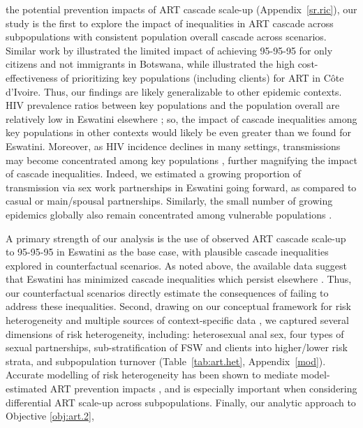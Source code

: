 the potential prevention impacts of ART cascade scale-up
\cite{Knight2022sr} (Appendix~\ref{sr.ric}),
our study is the first to explore the impact of
inequalities in ART cascade across subpopulations
with consistent population overall cascade across scenarios.
Similar work by \citet{Marukutira2020} illustrated the limited impact of
achieving 95-95-95 for only citizens and not immigrants in Botswana,
while \citet{Maheu-Giroux2019cost} illustrated the high cost-effectiveness of
prioritizing key populations (including clients) for ART in C\^{o}te d'Ivoire.
Thus, our findings are likely generalizable to other epidemic contexts.
HIV prevalence ratios between key populations and the population overall
are relatively low in Eswatini \vs elsewhere \cite{Baral2012,Hessou2019};
so, the impact of cascade inequalities among key populations in other contexts
would likely be even greater than we found for Eswatini.
Moreover, as HIV incidence declines in many settings,
transmissions may become concentrated among key populations \cite{Brown2019,Garnett2021},
further magnifying the impact of cascade inequalities.
Indeed, we estimated a growing proportion of transmission
via sex work partnerships in Eswatini going forward,
as compared to casual or main/spousal partnerships.
Similarly, the small number of growing epidemics globally
also remain concentrated among vulnerable populations \cite{UNAIDS2023}.
\par
A primary strength of our analysis is the use of
observed ART cascade scale-up to 95-95-95 in Eswatini as the base case,
with plausible cascade inequalities explored in counterfactual scenarios.
As noted above, the available data suggest that Eswatini has
minimized cascade inequalities which persist elsewhere \cite{Hakim2018}.
Thus, our counterfactual scenarios directly estimate
the consequences of failing to address these inequalities.
Second, drawing on our conceptual framework for risk heterogeneity \cite[Table~1]{Knight2022sr}
and multiple sources of context-specific data
\cite{SDHS2006,SHIMS1,SHIMS2,Baral2014,EswKP2014,EswIBBS2022},
we captured several dimensions of risk heterogeneity, including:
heterosexual anal sex,
four types of sexual partnerships,
sub-stratification of FSW and clients into higher/lower risk strata,
and subpopulation turnover
(Table~\ref{tab:art.het}, Appendix~\ref{mod}).
Accurate modelling of risk heterogeneity
has been shown to mediate model-estimated ART prevention impacts \cite{Hontelez2013},
and is especially important when considering differential ART scale-up across subpopulations.
Finally, our analytic approach to Objective \ref{obj:art.2},
